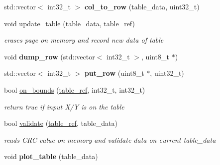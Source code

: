 \begin{DoxyCompactItemize}
std\+::vector$<$ int32\+\_\+t $>$ {\bfseries col\+\_\+to\+\_\+row} (table\+\_\+data, uint32\+\_\+t)
\item 
\mbox{\label{namespacetables_a609889745ffc450440eee727f8d28034}} 
void \hyperlink{namespacetables_a609889745ffc450440eee727f8d28034}{update\+\_\+table} (table\+\_\+data, \hyperlink{structtable__ref}{table\+\_\+ref})
\begin{DoxyCompactList}\small\item\em erases page on memory and record new data of table \end{DoxyCompactList}\item 
\mbox{\label{namespacetables_a3d4eae2328222f2672364baad17b14eb}} 
void {\bfseries dump\+\_\+row} (std\+::vector$<$ int32\+\_\+t $>$, uint8\+\_\+t $\ast$)
\item 
\mbox{\label{namespacetables_aacb653c68579815b85eca89c831e9300}} 
std\+::vector$<$ int32\+\_\+t $>$ {\bfseries put\+\_\+row} (uint8\+\_\+t $\ast$, uint32\+\_\+t)
\item 
\mbox{\label{namespacetables_a5df27daa6f33383e90a21d0ea12f6d9f}} 
bool \hyperlink{namespacetables_a5df27daa6f33383e90a21d0ea12f6d9f}{on\+\_\+bounds} (\hyperlink{structtable__ref}{table\+\_\+ref}, int32\+\_\+t, int32\+\_\+t)
\begin{DoxyCompactList}\small\item\em return true if input X/Y is on the table \end{DoxyCompactList}\item 
\mbox{\label{namespacetables_ad914a29af149c1059b5fcfb1501f6d87}} 
bool \hyperlink{namespacetables_ad914a29af149c1059b5fcfb1501f6d87}{validate} (\hyperlink{structtable__ref}{table\+\_\+ref}, table\+\_\+data)
\begin{DoxyCompactList}\small\item\em reads C\+RC value on memory and validate data on current table\+\_\+data \end{DoxyCompactList}\item 
\mbox{\label{namespacetables_acfce212d9f061ab7df55e665ab89932b}} 
void {\bfseries plot\+\_\+table} (table\+\_\+data)
\end{DoxyCompactItemize}



